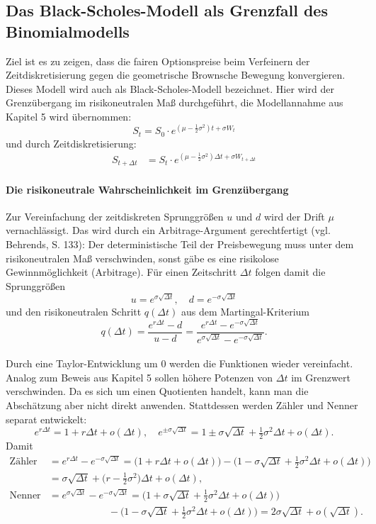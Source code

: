 \subsection{Das Black-Scholes-Modell als Grenzfall des Binomialmodells}
Ziel ist es zu zeigen, dass die fairen Optionspreise
beim Verfeinern der Zeitdiskretisierung gegen die geometrische Brownsche Bewegung konvergieren.
Dieses Modell wird auch als Black-Scholes-Modell bezeichnet. Hier wird der Grenzübergang im risikoneutralen Maß durchgeführt,
die Modellannahme aus Kapitel 5 wird übernommen:
$$
S_t = S_0 \cdot e^{(\mu - \frac{1}{2}\sigma^2)t + \sigma W_t}
$$
und durch Zeitdiskretisierung:
$$
\begin{aligned}
S_{t+\Delta t} &= S_t \cdot e^{(\mu - \frac{1}{2}\sigma^2)\Delta t + \sigma W_{t+\Delta t}}
\end{aligned}
$$
\paragraph{Die risikoneutrale Wahrscheinlichkeit im Grenzübergang}
Zur Vereinfachung der zeitdiskreten Sprunggrößen $u$ und $d$ wird der Drift $\mu$ vernachlässigt.
Das wird durch ein Arbitrage-Argument gerechtfertigt (vgl. Behrends\cite{behrends}, S. 133):
Der deterministische Teil der Preisbewegung muss unter dem risikoneutralen Maß verschwinden, 
sonst gäbe es eine risikolose Gewinnmöglichkeit (Arbitrage). 
Für einen Zeitschritt $\Delta t$ folgen damit die Sprunggrößen
$$
u = e^{\sigma \sqrt{\Delta t}},\quad d = e^{-\sigma \sqrt{\Delta t}}
$$
und den risikoneutralen Schritt $q(\Delta t)$ aus dem Martingal-Kriterium
$$
q(\Delta t) = \frac{e^{r \Delta t} - d}{u - d}
= \frac{e^{r \Delta t} - e^{-\sigma \sqrt{\Delta t}}}{e^{\sigma \sqrt{\Delta t}} - e^{-\sigma \sqrt{\Delta t}}}.
$$
\\ Durch eine Taylor-Entwicklung um $0$ werden die Funktionen wieder vereinfacht. Analog zum Beweis aus Kapitel 5
sollen höhere Potenzen von $\Delta t$ im Grenzwert verschwinden. Da es sich um einen Quotienten handelt,
kann man die Abschätzung aber nicht direkt anwenden. Stattdessen werden Zähler und Nenner separat entwickelt:
$$
e^{r\Delta t} = 1 + r\Delta t + o(\Delta t),\quad
e^{\pm \sigma\sqrt{\Delta t}} = 1 \pm \sigma \sqrt{\Delta t} + \tfrac12 \sigma^2 \Delta t + o(\Delta t).
$$
Damit
$$
\begin{aligned}
\text{Zähler} &= e^{r \Delta t} - e^{-\sigma \sqrt{\Delta t}}
= \big(1 + r\Delta t + o(\Delta t)\big) - \big(1 - \sigma \sqrt{\Delta t} + \tfrac12 \sigma^2 \Delta t + o(\Delta t)\big) \\
&= \sigma \sqrt{\Delta t} + \big(r - \tfrac12 \sigma^2\big)\Delta t + o(\Delta t), \\
\text{Nenner} &= e^{\sigma \sqrt{\Delta t}} - e^{-\sigma \sqrt{\Delta t}}
= \big(1 + \sigma \sqrt{\Delta t} + \tfrac12 \sigma^2 \Delta t + o(\Delta t)\big) \\
&\qquad\qquad\qquad - \big(1 - \sigma \sqrt{\Delta t} + \tfrac12 \sigma^2 \Delta t + o(\Delta t)\big)
= 2\sigma \sqrt{\Delta t} + o(\sqrt{\Delta t}).
\end{aligned}
$$
